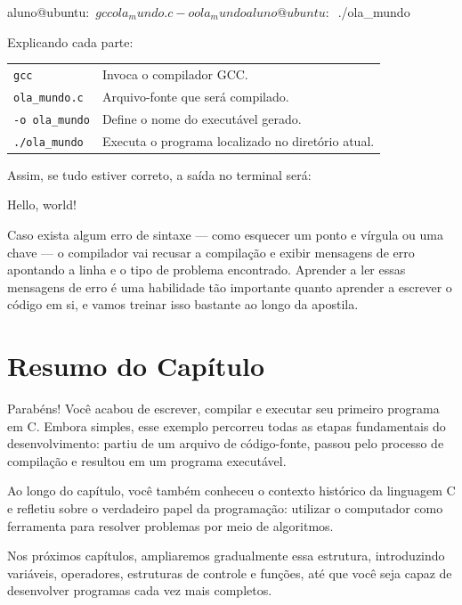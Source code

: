 \begin{terminal}
aluno@ubuntu:~$ gcc ola_mundo.c -o ola_mundo

aluno@ubuntu:~$ ./ola_mundo

\end{terminal}


Explicando cada parte:

\begin{tabular}{p{4.4cm}p{10cm}}
\texttt{gcc} & Invoca o compilador GCC.\\[0.2cm]

\texttt{ola\_mundo.c} &
Arquivo-fonte que será compilado.\\[0.2cm]

\texttt{-o ola\_mundo} &
Define o nome do executável gerado.\\[0.2cm]

\texttt{./ola\_mundo} &
Executa o programa localizado no diretório atual.
\end{tabular}


Assim, se tudo estiver correto, a saída no terminal será:

\begin{terminal}
Hello, world!
\end{terminal}

Caso exista algum erro de sintaxe — como esquecer um ponto e vírgula ou uma chave — o compilador vai recusar a compilação e exibir mensagens de erro apontando a linha e o tipo de problema encontrado. Aprender a ler essas mensagens de erro é uma habilidade tão importante quanto aprender a escrever o código em si, e vamos treinar isso bastante ao longo da apostila.


\section*{Resumo do Capítulo}

Parabéns! Você acabou de escrever, compilar e executar seu primeiro programa em C. Embora simples, esse exemplo percorreu todas as etapas fundamentais do desenvolvimento: partiu de um arquivo de código-fonte, passou pelo processo de compilação e resultou em um programa executável.

Ao longo do capítulo, você também conheceu o contexto histórico da linguagem C e refletiu sobre o verdadeiro papel da programação: utilizar o computador como ferramenta para resolver problemas por meio de algoritmos.

Nos próximos capítulos, ampliaremos gradualmente essa estrutura, introduzindo variáveis, operadores, estruturas de controle e funções, até que você seja capaz de desenvolver programas cada vez mais completos.

